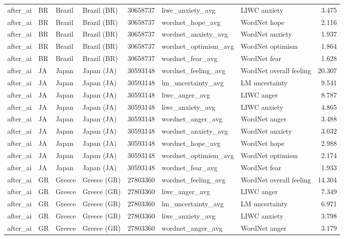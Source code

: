 \begin{tabular}{llllrllr}
after\_ai & BR & Brazil & Brazil (BR) & 30658737 & liwc\_anxiety\_avg & LIWC anxiety & 3.475 \\
after\_ai & BR & Brazil & Brazil (BR) & 30658737 & wordnet\_hope\_avg & WordNet hope & 2.116 \\
after\_ai & BR & Brazil & Brazil (BR) & 30658737 & wordnet\_anxiety\_avg & WordNet anxiety & 1.937 \\
after\_ai & BR & Brazil & Brazil (BR) & 30658737 & wordnet\_optimism\_avg & WordNet optimism & 1.864 \\
after\_ai & BR & Brazil & Brazil (BR) & 30658737 & wordnet\_fear\_avg & WordNet fear & 1.628 \\
after\_ai & JA & Japan & Japan (JA) & 30593148 & wordnet\_feeling\_avg & WordNet overall feeling & 20.307 \\
after\_ai & JA & Japan & Japan (JA) & 30593148 & lm\_uncertainty\_avg & LM uncertainty & 9.541 \\
after\_ai & JA & Japan & Japan (JA) & 30593148 & liwc\_anger\_avg & LIWC anger & 8.787 \\
after\_ai & JA & Japan & Japan (JA) & 30593148 & liwc\_anxiety\_avg & LIWC anxiety & 4.865 \\
after\_ai & JA & Japan & Japan (JA) & 30593148 & wordnet\_anger\_avg & WordNet anger & 3.488 \\
after\_ai & JA & Japan & Japan (JA) & 30593148 & wordnet\_anxiety\_avg & WordNet anxiety & 3.032 \\
after\_ai & JA & Japan & Japan (JA) & 30593148 & wordnet\_hope\_avg & WordNet hope & 2.988 \\
after\_ai & JA & Japan & Japan (JA) & 30593148 & wordnet\_optimism\_avg & WordNet optimism & 2.174 \\
after\_ai & JA & Japan & Japan (JA) & 30593148 & wordnet\_fear\_avg & WordNet fear & 1.933 \\
after\_ai & GR & Greece & Greece (GR) & 27803360 & wordnet\_feeling\_avg & WordNet overall feeling & 14.304 \\
after\_ai & GR & Greece & Greece (GR) & 27803360 & liwc\_anger\_avg & LIWC anger & 7.349 \\
after\_ai & GR & Greece & Greece (GR) & 27803360 & lm\_uncertainty\_avg & LM uncertainty & 6.971 \\
after\_ai & GR & Greece & Greece (GR) & 27803360 & liwc\_anxiety\_avg & LIWC anxiety & 3.798 \\
after\_ai & GR & Greece & Greece (GR) & 27803360 & wordnet\_anger\_avg & WordNet anger & 3.179 \\

\end{tabular}
